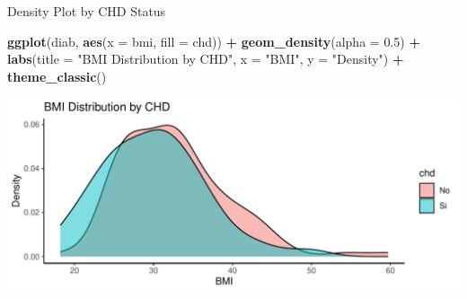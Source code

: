 \documentclass[
  ignorenonframetext,
]{beamer}
\newenvironment{Shaded}{\begin{snugshade}}{\end{snugshade}}
\newcommand{\AttributeTok}[1]{\textcolor[rgb]{0.13,0.29,0.53}{#1}}
\newcommand{\FloatTok}[1]{\textcolor[rgb]{0.00,0.00,0.81}{#1}}
\newcommand{\FunctionTok}[1]{\textcolor[rgb]{0.13,0.29,0.53}{\textbf{#1}}}
\newcommand{\NormalTok}[1]{#1}
\newcommand{\SpecialCharTok}[1]{\textcolor[rgb]{0.81,0.36,0.00}{\textbf{#1}}}
\newcommand{\StringTok}[1]{\textcolor[rgb]{0.31,0.60,0.02}{#1}}
\begin{document}
\begin{frame}[fragile]{Density Plot by CHD Status}
\label{density-plot-by-chd-status}
\begin{Shaded}
\begin{Highlighting}[]
\FunctionTok{ggplot}\NormalTok{(diab, }\FunctionTok{aes}\NormalTok{(}\AttributeTok{x =}\NormalTok{ bmi, }\AttributeTok{fill =}\NormalTok{ chd)) }\SpecialCharTok{+}
  \FunctionTok{geom\_density}\NormalTok{(}\AttributeTok{alpha =} \FloatTok{0.5}\NormalTok{) }\SpecialCharTok{+}
  \FunctionTok{labs}\NormalTok{(}\AttributeTok{title =} \StringTok{"BMI Distribution by CHD"}\NormalTok{, }\AttributeTok{x =} \StringTok{"BMI"}\NormalTok{, }\AttributeTok{y =} \StringTok{"Density"}\NormalTok{) }\SpecialCharTok{+}
  \FunctionTok{theme\_classic}\NormalTok{()}
\end{Highlighting}
\end{Shaded}

\includegraphics{StatisticsWithR-3-Exploratory_Analysis_II_And_Graphics_files/figure-beamer/unnamed-chunk-31-1.pdf}
\end{frame}
\end{document}
